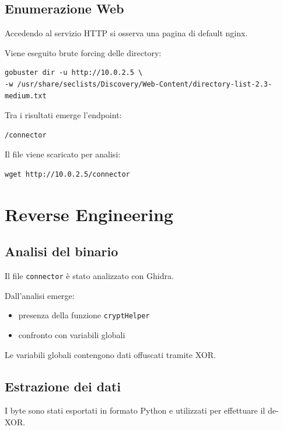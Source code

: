 \documentclass[a4paper,11pt]{article}
\begin{document}
\subsection{Enumerazione Web}

Accedendo al servizio HTTP si osserva una pagina di default nginx.

Viene eseguito brute forcing delle directory:

\begin{lstlisting}
gobuster dir -u http://10.0.2.5 \
-w /usr/share/seclists/Discovery/Web-Content/directory-list-2.3-medium.txt
\end{lstlisting}

Tra i risultati emerge l’endpoint:

\begin{lstlisting}
/connector
\end{lstlisting}

Il file viene scaricato per analisi:

\begin{lstlisting}
wget http://10.0.2.5/connector
\end{lstlisting}

\section{Reverse Engineering}

\subsection{Analisi del binario}

Il file \texttt{connector} è stato analizzato con Ghidra.

Dall’analisi emerge:
\begin{itemize}
    \item presenza della funzione \texttt{cryptHelper}
    \item confronto con variabili globali
\end{itemize}

Le variabili globali contengono dati offuscati tramite XOR.

\subsection{Estrazione dei dati}

I byte sono stati esportati in formato Python e utilizzati per effettuare il de-XOR.
\end{document}
